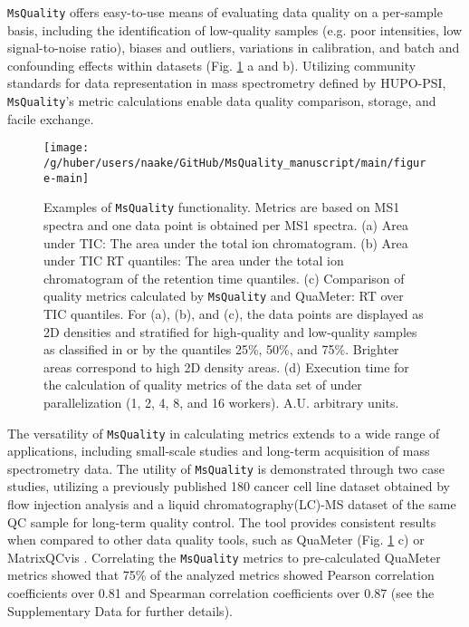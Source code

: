 \documentclass{bioinfo}
\begin{document}
\texttt{MsQuality} offers easy-to-use means of evaluating data quality on a 
per-sample basis, including the identification of low-quality samples 
(e.g. poor intensities, low signal-to-noise ratio), biases and outliers, 
variations in calibration, and batch and confounding effects within datasets
(Fig. \ref{fig:fig1} a and b). 
Utilizing community standards for data representation in mass spectrometry 
defined by HUPO-PSI, \texttt{MsQuality}'s metric calculations enable 
data quality comparison, storage, and facile exchange.

\begin{figure}[ht!]
    \centering
 	\texttt{[image: /g/huber/users/naake/GitHub/MsQuality\_manuscript/main/figure-main]}
 	  \caption{Examples of \texttt{MsQuality} functionality. Metrics are based
 	        on MS1 spectra and one data point is obtained per MS1 spectra.
 	        (a) Area under TIC: The area under the total ion chromatogram. 
            (b) Area under TIC RT quantiles: The area under the total ion
                chromatogram of the retention time quantiles. 
            (c) Comparison of quality metrics calculated by \texttt{MsQuality} 
                and QuaMeter: RT over TIC quantiles. 
            For (a), (b), and (c), the data points are displayed 
                as 2D densities and stratified for high-quality and low-quality
                samples as classified in \cite{Amidan2014} or by the
                quantiles 25\%, 50\%, and 75\%. Brighter areas correspond to 
                high 2D density areas.
            (d) Execution time for the calculation of quality metrics of the 
                data set of \cite{Amidan2014} under parallelization 
                (1, 2, 4, 8, and 16 workers). A.U. arbitrary units.
    } \label{fig:fig1}
\end{figure}

The versatility of \texttt{MsQuality} in calculating metrics extends to a 
wide range of applications, including small-scale studies and long-term 
acquisition of mass spectrometry data. 
The utility of \texttt{MsQuality} is demonstrated through two case studies, 
utilizing a previously published 180 cancer cell line dataset obtained by 
flow injection analysis \citep{Cherkaoui2022} and a liquid 
chromatography(LC)-MS dataset of
the same QC sample \citep{Amidan2014} for long-term quality control.
The tool provides consistent results 
when compared to other data quality tools, such as QuaMeter \citep{Ma2012} 
(Fig. \ref{fig:fig1} c) or MatrixQCvis \citep{Naake2022}. Correlating the 
\texttt{MsQuality} metrics to pre-calculated QuaMeter metrics 
\citep{Amidan2014} showed that 75\% of the analyzed metrics showed Pearson
correlation coefficients over 0.81 and Spearman correlation coefficients over 
0.87 (see the Supplementary Data for further details).
\end{document}
